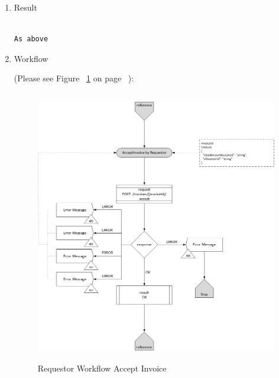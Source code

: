 \begin{enumerate}
\begin{table}[H]
\begin{center}
\begin{tabular}{|c|l|}
\end{tabular}
\end{center}

\end{table}

\item Result

\begin{tcolorbox}[boxrule=0pt, frame empty]
\begin{verbatim}

As above

\end{verbatim}
\end{tcolorbox}


\item Workflow

(Please see Figure ~\ref{fig:RAI} on page ~\pageref{fig:RAI}):

\begin{figure}[htbp]
    \centering
    \includegraphics[width=12cm,height=12cm,angle=0]{./diag/Workflow/Payment/AcceptInvoice-R-Workflow.png}
    \caption{Requestor Workflow Accept Invoice }
	\label{fig:RAI}
\end{figure}


\end{enumerate}


